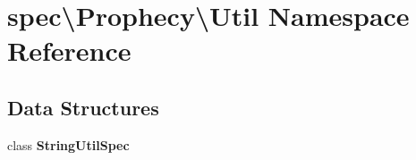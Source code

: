 \section{spec\textbackslash{}Prophecy\textbackslash{}Util Namespace Reference}
\label{namespacespec_1_1_prophecy_1_1_util}
\subsection*{Data Structures}
\begin{DoxyCompactItemize}
\item 
class {\bf String\+Util\+Spec}
\end{DoxyCompactItemize}
